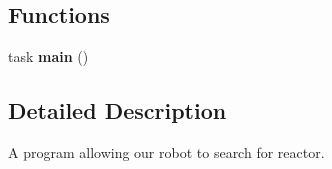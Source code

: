 \subsection*{Functions}
\begin{DoxyCompactItemize}
\item 
\hypertarget{reactor_8nxc_a9a2af8e2cd81255d3bf384db4a382807}{
task {\bfseries main} ()}
\label{reactor_8nxc_a9a2af8e2cd81255d3bf384db4a382807}

\end{DoxyCompactItemize}


\subsection{Detailed Description}
A program allowing our robot to search for reactor. 